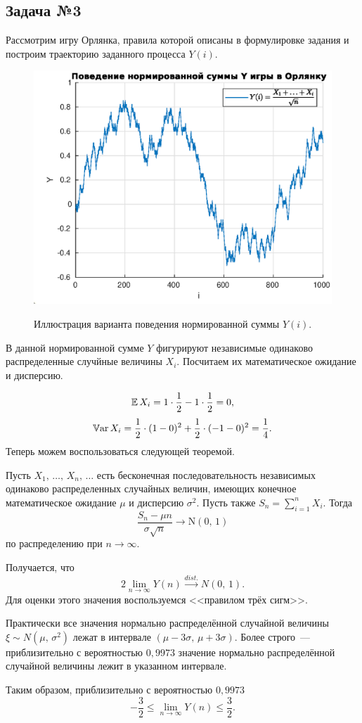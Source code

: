 \subsection{Задача №3}

Рассмотрим игру Орлянка, правила которой описаны в формулировке задания и построим траекторию заданного процесса $Y(i)$.
\begin{figure}[h]
        \noindent
        \centering
        {
                \includegraphics[width=120mm]{task_01/orl.eps}
        }
        \caption{Иллюстрация варианта поведения нормированной суммы $Y(i)$.}
\end{figure}

В данной нормированной сумме $Y$ фигурируют независимые одинаково распределенные случйные величины $X_i$.
Посчитаем их математическое ожидание и дисперсию.

$$
        \mathbb{E}\,X_i = 1 \cdot \frac12 - 1 \cdot \frac12 = 0,
$$
$$
        \mathbb{V}\mbox{ar}\,X_i = \frac12 \cdot (1 - 0)^2 + \frac12 \cdot (-1 - 0)^2 = \frac14.
$$
Теперь можем воспользоваться следующей теоремой.
\begin{theorem}
        Пусть $X_1,\,\ldots,\,X_n,\,\ldots$ есть бесконечная последовательность независимых одинаково распределенных случайных величин, имеющих конечное математическое ожидание $\mu$ и дисперсию $\sigma^2$. Пусть также $S_n = \sum_{i=1}^{n} X_i$. Тогда
        $$
                \frac{S_n - \mu n}{\sigma\sqrt{n}} \longrightarrow \mbox{N}(0,\, 1)
        $$
        по распределению при $n\to\infty$.
\end{theorem}
Получается, что
$$
        2\lim\limits_{n\to\infty}Y(n) \xrightarrow{dist.} N(0,\,1).
$$
Для оценки этого значения воспользуемся <<правилом трёх сигм>>.
\begin{theorem}
        Практически все значения нормально распределённой случайной величины $\xi \sim N(\mu,\,\sigma^2)$ лежат в интервале $(\mu - 3\sigma,\,\mu + 3\sigma)$. Более строго~--- приблизительно с вероятностью $0,9973$ значение нормально распределённой случайной величины лежит в указанном интервале.
\end{theorem}
Таким образом, приблизительно с вероятностью $0,9973$
$$
        -\frac32\leqslant\lim\limits_{n\to\infty}Y(n)\leqslant\frac32.
$$